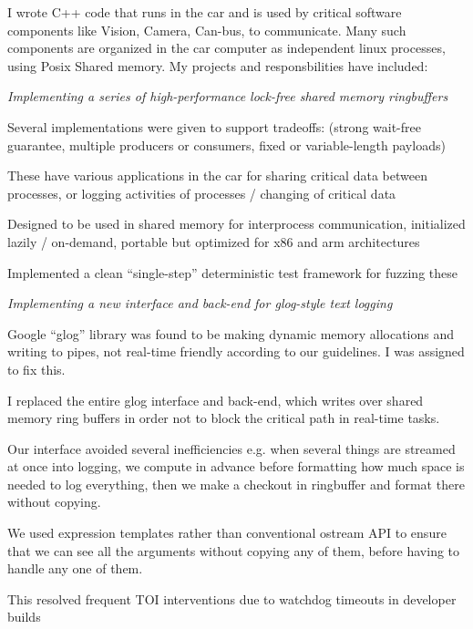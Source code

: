 \documentclass[margin,line]{resume}
\begin{document}
\begin{resume}
    I wrote C++ code that runs in the car and is used by critical software components like
    Vision, Camera, Can-bus, to communicate. Many such components are organized
    in the car computer as independent linux processes, using Posix Shared memory.
    My projects and responsbilities have included:

    \textsl{Implementing a series of high-performance lock-free shared memory ringbuffers}
    \begin{list2}
    \item{Several implementations were given to support tradeoffs: (strong wait-free guarantee, multiple producers or consumers, fixed or variable-length payloads)}
    \item{These have various applications in the car for sharing critical data between processes, or logging activities of processes / changing of critical data}
    \item{Designed to be used in shared memory for interprocess communication, initialized lazily / on-demand, portable but optimized for x86 and arm architectures}
    \item{Implemented a clean ``single-step'' deterministic test framework for fuzzing these}
    \end{list2}
    \textsl{Implementing a new interface and back-end for glog-style text logging}
    \begin{list2}
    \item Google ``glog'' library was found to be making dynamic memory allocations and writing to pipes, not real-time friendly
    according to our guidelines. I was assigned to fix this.
    \item I replaced the entire glog interface and back-end, which writes over shared memory ring buffers in order not to block the critical
    path in real-time tasks.
    \item Our interface avoided several inefficiencies e.g. when several things are streamed at once into logging, we compute in advance before
    formatting how much space is needed to log everything, then we make a checkout in ringbuffer and format there without copying.
    \item We used expression templates rather than conventional ostream API to ensure that we can see all the arguments without copying any of them,
    before having to handle any one of them.
    \item This resolved frequent TOI interventions due to watchdog timeouts in developer builds
    \end{list2}


\end{resume}
\end{document}
